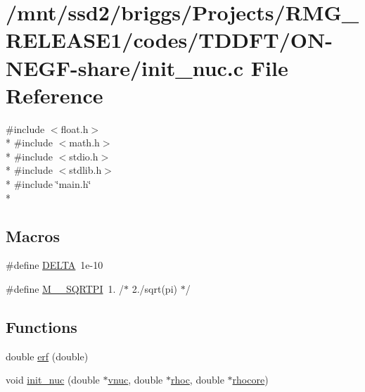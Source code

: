 \hypertarget{_t_d_d_f_t_2_o_n-_n_e_g_f-share_2init__nuc_8c}{\section{/mnt/ssd2/briggs/\-Projects/\-R\-M\-G\-\_\-\-R\-E\-L\-E\-A\-S\-E1/codes/\-T\-D\-D\-F\-T/\-O\-N-\/\-N\-E\-G\-F-\/share/init\-\_\-nuc.c File Reference}
\label{_t_d_d_f_t_2_o_n-_n_e_g_f-share_2init__nuc_8c}
}
{\ttfamily \#include $<$float.\-h$>$}\\*
{\ttfamily \#include $<$math.\-h$>$}\\*
{\ttfamily \#include $<$stdio.\-h$>$}\\*
{\ttfamily \#include $<$stdlib.\-h$>$}\\*
{\ttfamily \#include \char`\"{}main.\-h\char`\"{}}\\*
\subsection*{Macros}
\begin{DoxyCompactItemize}
\item 
\#define \hyperlink{_t_d_d_f_t_2_o_n-_n_e_g_f-share_2init__nuc_8c_a3fd2b1bcd7ddcf506237987ad780f495}{D\-E\-L\-T\-A}~1e-\/10
\item 
\#define \hyperlink{_t_d_d_f_t_2_o_n-_n_e_g_f-share_2init__nuc_8c_a631ff334c4a1a6db2e8a7ff4acbe48a5}{M\-\_\-\_\-\-S\-Q\-R\-T\-P\-I}~1.  /$\ast$ 2./sqrt(pi) $\ast$/
\end{DoxyCompactItemize}
\subsection*{Functions}
\begin{DoxyCompactItemize}
\item 
double \hyperlink{_t_d_d_f_t_2_o_n-_n_e_g_f-share_2init__nuc_8c_af00aa0dd70b74faf5361c10570a60a45}{erf} (double)
\item 
void \hyperlink{_t_d_d_f_t_2_o_n-_n_e_g_f-share_2init__nuc_8c_ade32dff510094ba85fc4880a4804b88b}{init\-\_\-nuc} (double $\ast$\hyperlink{md_8h_a46d07cd58431537b88a42087aa4e15f0}{vnuc}, double $\ast$\hyperlink{md_8h_a5e9e67f3a37119e4c22c096a300ca7a3}{rhoc}, double $\ast$\hyperlink{md_8h_a591b660d2f8ec39665ed0237c56502b9}{rhocore})
\end{DoxyCompactItemize}


